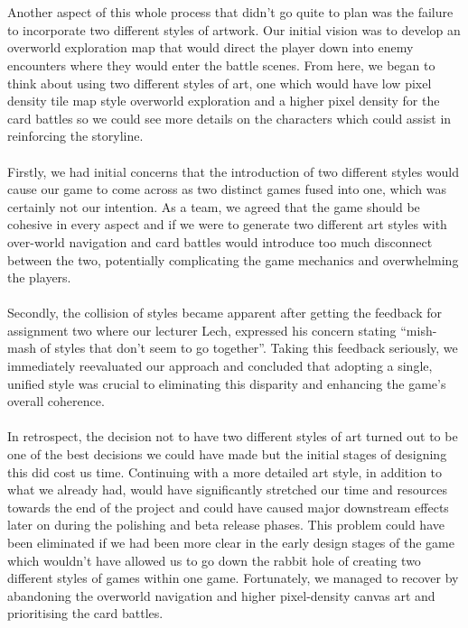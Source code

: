 \documentclass[a4paper]{article}
\begin{document}
\\\\
Another aspect of this whole process that didn't go quite to plan was the failure to incorporate two different styles of artwork. Our initial vision was to develop an overworld exploration map that would direct the player down into enemy encounters where they would enter the battle scenes. From here, we began to think about using two different styles of art, one which would have low pixel density tile map style overworld exploration and a higher pixel density for the card battles so we could see more details on the characters which could assist in reinforcing the storyline.
\\\\
Firstly, we had initial concerns that the introduction of two different styles would cause our game to come across as two distinct games fused into one, which was certainly not our intention. As a team, we agreed that the game should be cohesive in every aspect and if we were to generate two different art styles with over-world navigation and card battles would introduce too much disconnect between the two, potentially complicating the game mechanics and overwhelming the players.
\\\\
Secondly, the collision of styles became apparent after getting the feedback for assignment two where our lecturer Lech, expressed his concern stating “mish-mash of styles that don’t seem to go together”. Taking this feedback seriously, we immediately reevaluated our approach and concluded that adopting a single, unified style was crucial to eliminating this disparity and enhancing the game's overall coherence.
\\\\
In retrospect, the decision not to have two different styles of art turned out to be one of the best decisions we could have made but the initial stages of designing this did cost us time. Continuing with a more detailed art style, in addition to what we already had, would have significantly stretched our time and resources towards the end of the project and could have caused major downstream effects later on during the polishing and beta release phases. This problem could have been eliminated if we had been more clear in the early design stages of the game which wouldn’t have allowed us to go down the rabbit hole of creating two different styles of games within one game. Fortunately, we managed to recover by abandoning the overworld navigation and higher pixel-density canvas art and prioritising the card battles.
\end{document}
